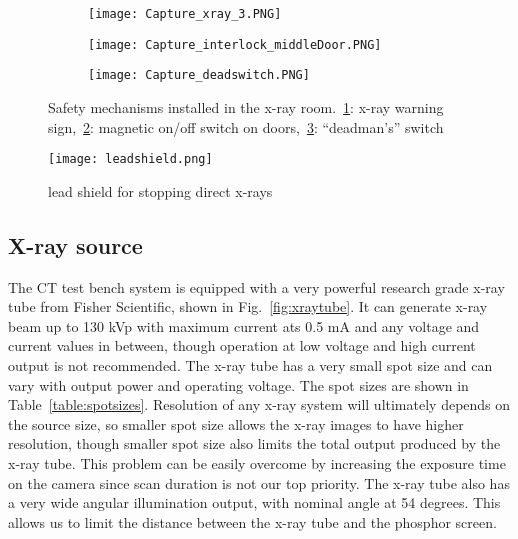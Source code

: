 \begin{figure}[h]
	\begin{subfigure}[b]{0.3\linewidth}
	\texttt{[image: Capture\_xray\_3.PNG]}
	\caption{}
	\label{fig:xraywarningsign}
	\end{subfigure}
\hspace{0.2cm}
	\begin{subfigure}[b]{0.3\linewidth}
	\texttt{[image: Capture\_interlock\_middleDoor.PNG]}
	\caption{}
	\label{fig:doorinterlock}
	\end{subfigure}	
\hspace{0.2cm}	
	\begin{subfigure}[b]{0.3\linewidth}
	\texttt{[image: Capture\_deadswitch.PNG]}
	\caption{}
	\label{fig:deadmanswitch}
	\end{subfigure}
\caption{Safety mechanisms installed in the x-ray room.~\ref{fig:xraywarningsign}: x-ray warning sign,~\ref{fig:doorinterlock}: magnetic on/off switch on doors,~\ref{fig:deadmanswitch}: ``deadman's'' switch}
\label{fig:safetycomponents}
\end{figure}

\begin{figure}[h]
\centering
\texttt{[image: leadshield.png]}	
\caption{lead shield for stopping direct x-rays}
\label{fig:leadshield}
\end{figure}

\subsection{X-ray source}
The CT test bench system is equipped with a very powerful research grade x-ray tube from Fisher Scientific, shown in Fig.~\ref{fig:xraytube}.  It can generate x-ray beam up to 130 kVp with maximum current ats 0.5 mA and any voltage and current values in between, though operation at low voltage and high current output is not recommended.  The x-ray tube has a very small spot size and can vary with output power and operating voltage.  The spot sizes are shown in Table~\ref{table:spotsizes}.  Resolution of any x-ray system will ultimately depends on the source size, so smaller spot size allows the x-ray images to have higher resolution, though smaller spot size also limits the total output produced by the x-ray tube.  This problem can be easily overcome by increasing the exposure time on the camera since scan duration is not our top priority.  The x-ray tube also has a very wide angular illumination output, with nominal angle at 54 degrees.  This allows us to limit the distance between the x-ray tube and the phosphor screen.

